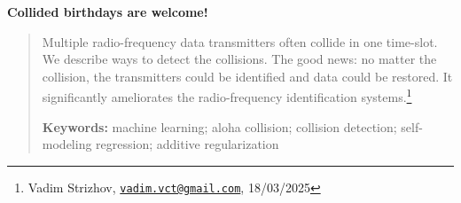 \documentclass[12pt]{article}
\begin{document}
\begin{center}
{\Huge\bf Collided birthdays are welcome!}
\end{center}

\begin{quote}
Multiple radio-frequency data transmitters often collide in one time-slot. We describe ways to detect the collisions. The good news: no matter the collision, the transmitters could be identified and data could be restored. It significantly ameliorates the radio-frequency identification systems.\footnote{Vadim Strizhov, \href{mailto:vadim.vct@gmail.com}{\texttt{vadim.vct@gmail.com}}, 18/03/2025}

\bigskip
\noindent \textbf{Keywords:} machine learning; aloha collision; collision detection; self-modeling regression; additive regularization
\bigskip
\end{quote}
\end{document}
